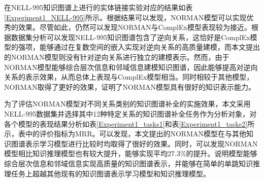 \documentclass[algorithmlist, AutoFakeBold, AutoFakeSlant, figurelist, tablelist, nomlist, engineering]{seuthesix}
\begin{document}
在NELL-995知识图谱上进行的实体链接实验对应的结果如表\ref{Experiment1_NELL-995}所示。根据结果可以发现，NORMAN模型可以实现优秀的效果。尽管如此，仍然可以发现NORMAN与ComplEx模型表现较为接近。根据数据集分析可以发现NELL-995知识图谱包含了逆向关系，这恰好是ComplEx模型的强项，能够通过在复数空间的嵌入实现对逆向关系的高质量建模，而本文提出的NORMAN模型则没有针对逆向关系进行独立的建模表示。然而，由于NORMAN模型能够综合层次信息和邻域信息建模知识图谱，因此能够提高对逆向关系的表示效果，从而总体上表现与ComplEx模型相当。同时相较于其他模型，NORMAN取得了更好的效果，证明了NORMAN模型具有很好的知识表示能力。

为了评估NORMAN模型对不同关系类别的知识图谱补全的实施效果，本文采用NELL-995数据集并选择其中12种特定关系的知识图谱补全任务作为分析对象，对各个模型的表现结果分析如表\ref{Experiment1_tasks1}和表\ref{Experiment1_tasks2}所示，表中的评价指标为MRR。可以发现，本文提出的NORMAN模型在与其他知识图谱表示学习模型进行比较时均取得了很好的效果。同时，可以发现NORMAN模型相比知识推理模型也有较大提升，能够实现平均$27.3\%$的提升。说明模型能够综合层次信息和邻域信息实现高质量的知识图谱表示，并能够在简单的单跳知识推理任务上超越其他现有的知识图谱表示学习模型和知识推理模型。
\end{document}
